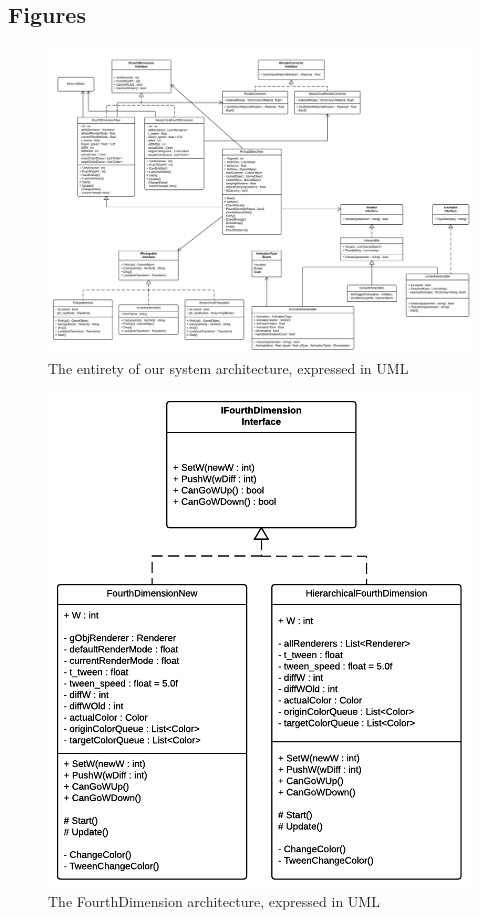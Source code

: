 \subsection{Figures}
\begin{figure}[h!]
	\centering
	\includegraphics[angle=90,origin=c,scale=0.5]{pictures/4D-Puzzle-Flowchart.png}
	\caption{The entirety of our system architecture, expressed in UML}
	\label{completeUML}
\end{figure}

\begin{figure}[h!]
	\centering
	\includegraphics[scale=1]{pictures/FourthDimensionUML.png}
	\caption{The FourthDimension architecture, expressed in UML}
	\label{fourthOnlyUML}
\end{figure}

